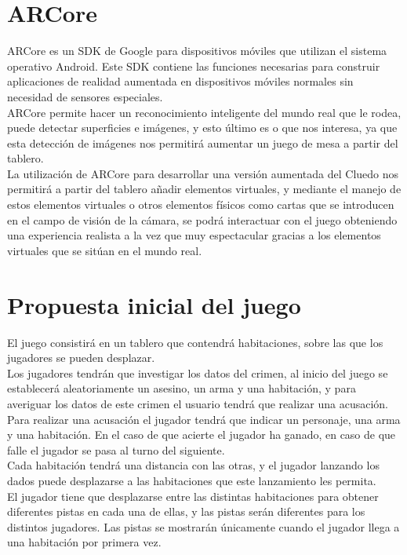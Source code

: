 \section{ARCore}
ARCore es un SDK de Google para dispositivos móviles que utilizan el sistema operativo Android. Este SDK contiene las funciones necesarias para construir aplicaciones de realidad aumentada en dispositivos móviles normales sin necesidad de sensores especiales.\\

ARCore permite hacer un reconocimiento inteligente del mundo real que le rodea, puede detectar superficies e imágenes, y esto último es o que nos interesa, ya que esta detección de imágenes nos permitirá aumentar un juego de mesa a partir del tablero.\\

La utilización de ARCore para desarrollar una versión aumentada del Cluedo nos permitirá a partir del tablero añadir elementos virtuales, y mediante el manejo de estos elementos virtuales o otros elementos físicos como cartas que se introducen en el campo de visión de la cámara, se podrá interactuar con el juego obteniendo una experiencia realista a la vez que muy espectacular gracias a los elementos virtuales que se sitúan en el mundo real.

\section{Propuesta inicial del juego}
El juego consistirá en un tablero que contendrá habitaciones, sobre las que los jugadores se pueden desplazar.\\

Los jugadores tendrán que investigar los datos del crimen, al inicio del juego se establecerá aleatoriamente un asesino, un arma y una habitación, y para averiguar los datos de este crimen el usuario tendrá que realizar una acusación.\\

Para realizar una acusación el jugador tendrá que indicar un personaje, una arma y una habitación. En el caso de que acierte el jugador ha ganado, en caso de que falle el jugador se pasa al turno del siguiente.\\

Cada habitación tendrá una distancia con las otras, y el jugador lanzando los dados puede desplazarse a las habitaciones que este lanzamiento les permita.\\

El jugador tiene que desplazarse entre las distintas habitaciones para obtener diferentes pistas en cada una de ellas, y las pistas serán diferentes para los distintos jugadores. Las pistas se mostrarán únicamente cuando el jugador llega a una habitación por primera vez.\\

